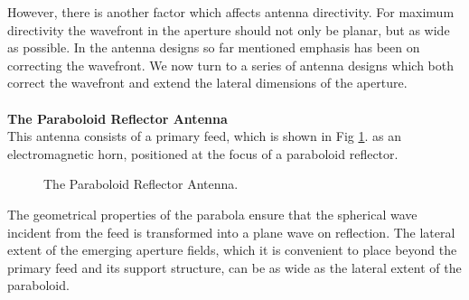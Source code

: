 However, there is another factor which affects antenna directivity. For maximum directivity the wavefront in the aperture should not only be planar, but as wide as possible. In the antenna designs so far mentioned emphasis has been on correcting the wavefront. We now turn to a series of antenna designs which both correct the wavefront and extend the lateral dimensions of the aperture.\\
\\
\textbf{The Paraboloid Reflector Antenna}\\
This antenna consists of a primary feed, which is shown in Fig \ref{fig:para-ref}. as an electromagnetic horn, positioned at the focus of a paraboloid reflector.
\begin{figure}[htbp]
	\begin{center}
	\end{center}
	\caption{The Paraboloid Reflector Antenna.}
	\label{fig:para-ref}
\end{figure}
The geometrical properties of the parabola ensure that the spherical wave incident from the feed is transformed into a plane wave on reflection. The lateral extent of the emerging aperture fields, which it is convenient to place beyond the primary feed and its support structure, can be as wide as the lateral extent of the paraboloid.


